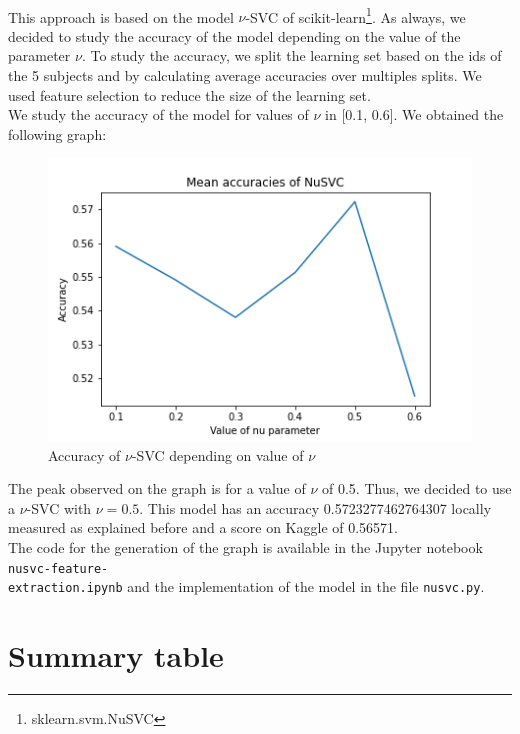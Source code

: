 \documentclass[a4paper, 11pt, oneside]{article}
\begin{document}
\paragraph{}This approach is based on the model $\nu$-SVC of scikit-learn\footnote{sklearn.svm.NuSVC}. As always, we decided to study the accuracy of the model depending on the value of the parameter $\nu$. To study the accuracy, we split the learning set based on the ids of the 5 subjects and by calculating average accuracies over multiples splits. We used feature selection to reduce the size of the learning set.\\
We study the accuracy of the model for values of $\nu$ in [0.1, 0.6]. We obtained the following graph:
\begin{figure}[H]
\centering
\includegraphics[scale=0.4]{nusvm/svm_nu_svc_accuracies_1.png}
\caption{Accuracy of $\nu$-SVC depending on value of $\nu$}
\end{figure}
The peak observed on the graph is for a value of $\nu$ of 0.5. Thus, we decided to use a $\nu$-SVC with $\nu = 0.5$. This model has an accuracy 0.5723277462764307 locally measured as explained before and a score on Kaggle of 0.56571.\\
The code for the generation of the graph is available in the Jupyter notebook \texttt{nusvc-feature-\\extraction.ipynb} and the implementation of the model in the file \texttt{nusvc.py}.


\section{Summary table}
\end{document}
